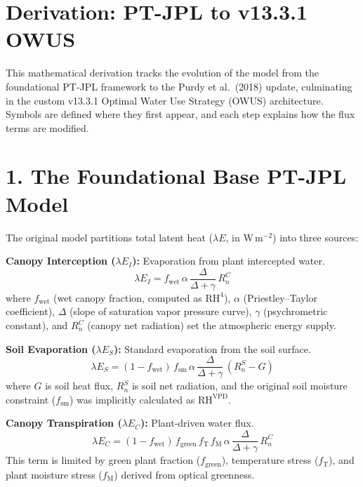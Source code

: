 \documentclass[11pt]{article}
\begin{document}
\section*{Derivation: PT-JPL to v13.3.1 OWUS}

This mathematical derivation tracks the evolution of the model from the foundational PT-JPL framework to the Purdy et al.~(2018) update, culminating in the custom v13.3.1 Optimal Water Use Strategy (OWUS) architecture. Symbols are defined where they first appear, and each step explains how the flux terms are modified.

\section*{1. The Foundational Base PT-JPL Model}

The original model partitions total latent heat ($\lambda E$, in $\mathrm{W\,m^{-2}}$) into three sources:

\textbf{Canopy Interception ($\lambda E_{I}$):} Evaporation from plant intercepted water.
\begin{equation}
\lambda E_{I} = f_{\mathrm{wet}}\,\alpha\,\frac{\Delta}{\Delta + \gamma}\,R_{n}^{C}
\end{equation}
where $f_{\mathrm{wet}}$ (wet canopy fraction, computed as $\mathrm{RH}^4$), $\alpha$ (Priestley--Taylor coefficient), $\Delta$ (slope of saturation vapor pressure curve), $\gamma$ (psychrometric constant), and $R_{n}^{C}$ (canopy net radiation) set the atmospheric energy supply.

\textbf{Soil Evaporation ($\lambda E_{S}$):} Standard evaporation from the soil surface.
\begin{equation}
\lambda E_{S} = (1 - f_{\mathrm{wet}})\,f_{\mathrm{sm}}\,\alpha\,\frac{\Delta}{\Delta + \gamma}\,(R_{n}^{S} - G)
\end{equation}
where $G$ is soil heat flux, $R_{n}^{S}$ is soil net radiation, and the original soil moisture constraint ($f_{\mathrm{sm}}$) was implicitly calculated as $\mathrm{RH}^{\mathrm{VPD}}$.

\textbf{Canopy Transpiration ($\lambda E_{C}$):} Plant-driven water flux.
\begin{equation}
\lambda E_{C} = (1 - f_{\mathrm{wet}})\,f_{\mathrm{green}}\,f_{\mathrm{T}}\,f_{\mathrm{M}}\,\alpha\,\frac{\Delta}{\Delta + \gamma}\,R_{n}^{C}
\end{equation}
This term is limited by green plant fraction ($f_{\mathrm{green}}$), temperature stress ($f_{\mathrm{T}}$), and plant moisture stress ($f_{\mathrm{M}}$) derived from optical greenness.
\end{document}
